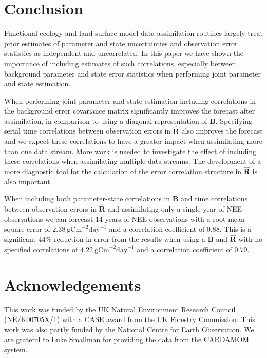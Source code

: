 \section{Conclusion}

Functional ecology and land surface model data assimilation routines largely treat prior estimates of parameter and state uncertainties and observation error statistics as independent and uncorrelated. In this paper we have shown the importance of including estimates of such correlations, especially between background parameter and state error statistics when performing joint parameter and state estimation.

When performing joint parameter and state estimation including correlations in the background error covariance matrix significantly improves the forecast after assimilation, in comparison to using a diagonal representation of $\textbf{B}$. Specifying serial time correlations between observation errors in $\hat{\textbf{R}}$ also improves the forecast and we expect these correlations to have a greater impact when assimilating more than one data stream. More work is needed to investigate the effect of including these correlations when assimilating multiple data streams. The development of a more diagnostic tool for the calculation of the error correlation structure in $\hat{\textbf{R}}$ is also important.  

When including both parameter-state correlations in $\textbf{B}$ and time correlations between observation errors in $\hat{\textbf{R}}$ and assimilating only a single year of NEE observations we can forecast 14 years of NEE observations with a root-mean square error of $2.38~\text{gCm}^{-2}\text{day}^{-1}$ and a correlation coefficient of $0.88$. This is a significant $44\%$ reduction in error from the results when using a $\textbf{B}$ and $\hat{\textbf{R}}$ with no specified correlations of $4.22~\text{gCm}^{-2}\text{day}^{-1}$ and a correlation coefficient of $0.79$.

\section{Acknowledgements}

This work was funded by the UK Natural Environment Research Council (NE/K00705X/1) with a CASE award from the UK Forestry Commission. This work was also partly funded by the National Centre for Earth Observation. We are grateful to Luke Smallman for providing the data from the CARDAMOM system.

